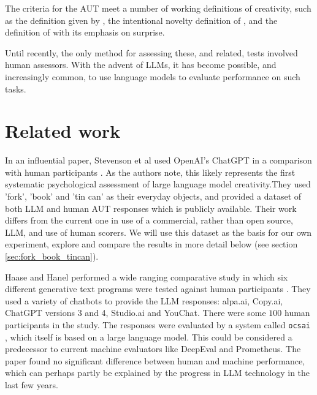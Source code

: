 \documentclass{article}
\begin{document}
The criteria for the AUT meet a number of working definitions of creativity, such as the definition given by \citet{runco2012standard}, the intentional novelty definition of \citet{weisberg2016creativity}, and the definition of \citet{simonton2018defining} with its emphasis on surprise.




Until recently, the only method for assessing these, and related, tests involved human assessors. With the advent of LLMs, it has become possible, and increasingly common, to use language models to evaluate performance on such tasks. 

\section{Related work}
\label{sec:related_work}
In an influential paper, Stevenson et al used OpenAI's ChatGPT in a comparison with human participants \cite{stevenson2022puttinggpt3screativityalternative}. As the authors note, this likely represents the first
systematic psychological assessment of large language model creativity.They used 'fork', 'book' and 'tin can' as their everyday objects, and provided a dataset of both LLM and human AUT responses which is publicly available. Their work differs from the current one in use of a commercial, rather than open source, LLM, and use of human scorers. We will use this dataset as the basis for our own experiment, explore and compare the results in more detail below (see section \ref{sec:fork_book_tincan}).  




Haase and Hanel performed a wide ranging comparative study in which six different generative text programs were tested against human participants \citet{Haase_2023}. They used a variety of chatbots to provide the LLM responses: alpa.ai, Copy.ai, ChatGPT versions 3 and 4, Studio.ai and YouChat. There were some $100$ human participants in the study. The responses were evaluated by a system called \texttt{ocsai} \citet{organisciak2023beyond}, which itself is based on a large language model. This could be considered a predecessor to current machine evaluators like DeepEval and Prometheus. The paper found no significant difference between human and machine performance, which can perhaps partly be explained by the progress in LLM technology in the last few years.     
\end{document}
